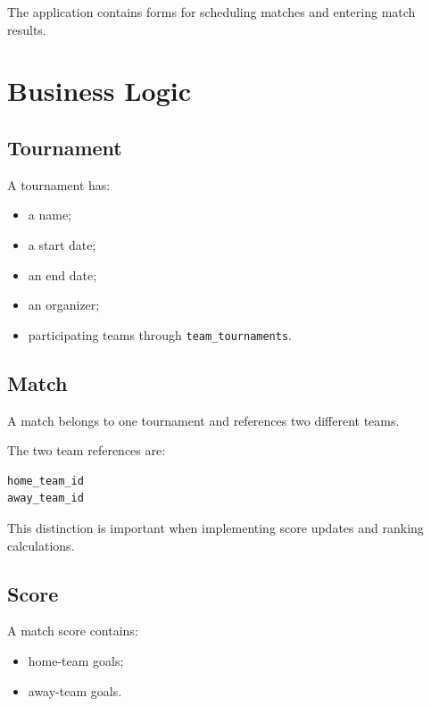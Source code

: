 \documentclass[12pt,a4paper]{article}
\begin{document}
The application contains forms for scheduling matches and entering
match results.


\section{Business Logic}

\subsection{Tournament}

A tournament has:

\begin{itemize}
    \item a name;
    \item a start date;
    \item an end date;
    \item an organizer;
    \item participating teams through \texttt{team\_tournaments}.
\end{itemize}

\subsection{Match}

A match belongs to one tournament and references two different teams.

The two team references are:

\begin{lstlisting}
home_team_id
away_team_id
\end{lstlisting}

This distinction is important when implementing score updates and
ranking calculations.

\subsection{Score}

A match score contains:

\begin{itemize}
    \item home-team goals;
    \item away-team goals.
\end{itemize}
\end{document}
